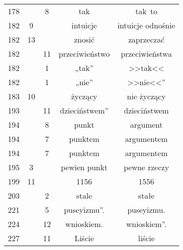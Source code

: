 \documentclass[a4paper,11pt]{article}
\begin{document}
\begin{center}
\begin{tabular}{|c|c|c|c|c|}
    178 & &  8 & tak & tak~to \\
    182 &  9 & & intuicje & intuicje odnośnie \\
    182 & 13 & & znosić & zaprzeczać \\
    182 & & 11 & przeciwieństwo & przeciwieństwa \\
    182 & &  1 & „tak” & >>tak<<  %
    \\
    182 & &  1 & „nie” & >>nie<<”  %
    \\
    183 & 10 & & życzący & nie życzący \\
    193 & & 11 & dzieciństwem” & dzieciństwem \\
    194 & &  8 & punkt & argument \\
    194 & &  7 & punktem & argumentem \\
    194 & &  7 & punktem & argumentem \\
    195 &  3 & & pewien punkt & pewne rzeczy \\
    199 & 11 & & 1156 & 1556 \\
    203 & &  2 & stale & stałe \\
    221 & &  5 & puseyizmu”. & puseyizmu. \\
    224 & & 12 & wnioskiem. & wnioskiem”. \\
    227 & & 11 & Liście & liście \\
    \hline
  \end{tabular}






\end{center}
\end{document}
